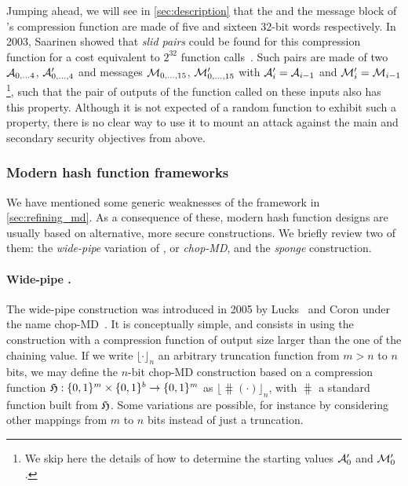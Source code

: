 Jumping ahead, we will see in \autoref{sec:description} that the \iv and the message block of \shaone's compression function are made of five and sixteen
32-bit words respectively. In 2003, Saarinen showed that \emph{slid pairs} could be found for this compression function for a cost equivalent to $2^{32}$
function calls~\cite{DBLP:conf/fse/Saarinen03}. Such pairs are made of two \ivs $\mathcal{A}_{0,\ldots4}$, $\mathcal{A}'_{0,\ldots,4}$ and messages $\mathcal{M}_{0,\ldots,15}$,
$\mathcal{M}'_{0,\ldots,15}$ with $\mathcal{A}'_i = \mathcal{A}_{i-1}$ and $\mathcal{M}'_i = \mathcal{M}_{i-1}$\footnote{We skip here the details of how to determine the starting values $\mathcal{A}'_0$ and $\mathcal{M}'_0$.}, such that the
pair of outputs of the function called on these inputs also has this property. Although it is not expected of a random function to exhibit such a property, there is no clear way to use it to mount
an attack against the main and secondary security objectives from above.


\subsubsection{Modern hash function frameworks}
\label{sec:betterhash}

We have mentioned some generic weaknesses of the \merkdam framework in \autoref{sec:refining_md}. As a consequence of these, modern hash function designs are usually based on alternative,
more secure constructions. We briefly review two of them: the \emph{wide-pipe} variation of \merkdam, or \emph{chop-MD}, and the \emph{sponge} construction.

\paragraph{Wide-pipe \merkdam.} The wide-pipe construction was introduced in 2005 by Lucks~\cite{DBLP:conf/asiacrypt/Lucks05} and Coron \etal under the name chop-MD~\cite{DBLP:conf/crypto/CoronDMP05}.
It is conceptually simple, and consists in using the \merkdam construction with a compression function of output size larger than the one of the chaining value. If we write $\lfloor\cdot\rfloor_n$
an arbitrary truncation function from $m > n$ to $n$ bits, we may define the $n$-bit chop-MD construction based on a compression function $\operatorname{\mathfrak{H}} : \{0,1\}^m \times \{0,1\}^b \rightarrow \{0,1\}^m$
as $\lfloor\hash(\cdot)\rfloor_n$, with $\hash$ a standard \merkdam function built from $\operatorname{\mathfrak{H}}$. Some variations are possible, for instance by considering other mappings from $m$ to $n$
bits instead of just a truncation.

